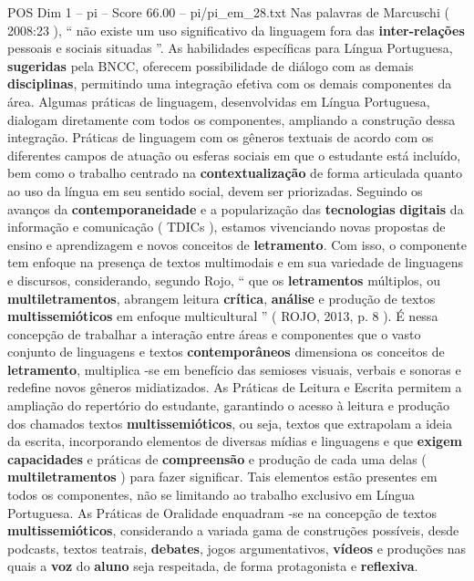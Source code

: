 \begin{textsample}{POS Dim 1 – pi – Score 66.00 – pi/pi\_em\_28.txt}
Nas palavras de Marcuschi ( 2008:23 ), “ não existe um uso significativo da linguagem fora das \textbf{inter-relações} pessoais e sociais situadas ”.
As habilidades específicas para Língua Portuguesa, \textbf{sugeridas} pela BNCC, oferecem possibilidade de diálogo com as demais \textbf{disciplinas}, permitindo uma integração efetiva com os demais componentes da área.
Algumas práticas de linguagem, desenvolvidas em Língua Portuguesa, dialogam diretamente com todos os componentes, ampliando a construção dessa integração.
Práticas de linguagem com os gêneros textuais de acordo com os diferentes campos de atuação ou esferas sociais em que o estudante está incluído, bem como o trabalho centrado na \textbf{contextualização} de forma articulada quanto ao uso da língua em seu sentido social, devem ser priorizadas.
Seguindo os avanços da \textbf{contemporaneidade} e a popularização das \textbf{tecnologias} \textbf{digitais} da informação e comunicação ( TDICs ), estamos vivenciando novas propostas de ensino e aprendizagem e novos conceitos de \textbf{letramento}.
Com isso, o componente tem enfoque na presença de textos multimodais e em sua variedade de linguagens e discursos, considerando, segundo Rojo, “ que os \textbf{letramentos} múltiplos, ou \textbf{multiletramentos}, abrangem leitura \textbf{crítica}, \textbf{análise} e produção de textos \textbf{multissemióticos} em enfoque multicultural ” ( ROJO, 2013, p. 8 ).
É nessa concepção de trabalhar a interação entre áreas e componentes que o vasto conjunto de linguagens e textos \textbf{contemporâneos} dimensiona os conceitos de \textbf{letramento}, multiplica -se em benefício das semioses visuais, verbais e sonoras e redefine novos gêneros midiatizados.
As Práticas de Leitura e Escrita permitem a ampliação do repertório do estudante, garantindo o acesso à leitura e produção dos chamados textos \textbf{multissemióticos}, ou seja, textos que extrapolam a ideia da escrita, incorporando elementos de diversas mídias e linguagens e que \textbf{exigem} \textbf{capacidades} e práticas de \textbf{compreensão} e produção de cada uma delas ( \textbf{multiletramentos} ) para fazer significar.
Tais elementos estão presentes em todos os componentes, não se limitando ao trabalho exclusivo em Língua Portuguesa.
As Práticas de Oralidade enquadram -se na concepção de textos \textbf{multissemióticos}, considerando a variada gama de construções possíveis, desde podcasts, textos teatrais, \textbf{debates}, jogos argumentativos, \textbf{vídeos} e produções nas quais a \textbf{voz} do \textbf{aluno} seja respeitada, de forma protagonista e \textbf{reflexiva}.

\end{textsample}
